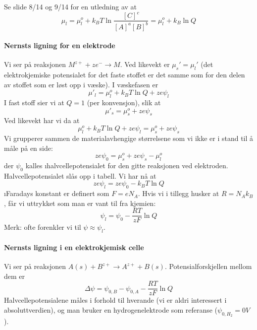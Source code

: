Se slide 8/14 og 9/14 for en utledning av at
\begin{equation}
	\mu_l=\mu_l^o+k_BT\ln\frac{[C]^c}{[A]^a[B]^b}=\mu_l^o+k_B\ln Q
\end{equation}

\paragraph{Nernsts ligning for en elektrode} Vi ser på reaksjonen $M^{z+}+ze^-\rightarrow M$. Ved likevekt er $\mu_{s}'=\mu_{l}'$ (det elektrokjemiske potensialet for det faste stoffet er det samme som for den delen av stoffet som er løst opp i væske).
I væskefasen er 
\begin{equation}
	\mu'_l=\mu_l^o+k_BT\ln Q+ze\psi_l
\end{equation}
I fast stoff sier vi at $Q=1$ (per konvensjon), slik at
\begin{equation}
	\mu'_s=\mu_s^o+ze\psi_s
\end{equation}
Ved likevekt har vi da at
\begin{equation}
	\mu_l^o+k_BT\ln Q+ze\psi_l=\mu_s^o+ze\psi_s
\end{equation}
Vi grupperer sammen de materialavhengige størrelsene som vi ikke er i stand til å måle på en side:
\begin{equation}
	ze\psi_0=\mu_s^o+ze\psi_s-\mu_l^o
\end{equation}
der $\psi_0$ kalles \i{halvcellepotensialet} for den gitte reaksjonen ved elektroden. Halvcellepotensialet slås opp i tabell. Vi har nå at
\begin{equation}
	ze\psi_l=ze\psi_0-k_BT\ln Q
\end{equation}
\i{Faradays konstant} er definert som $F=eN_A$. Hvis vi i tillegg husker at $R=N_Ak_B$, får vi uttrykket som man er vant til fra kjemien:
\begin{equation}
	\psi_l=\psi_0-\frac{RT}{zF}\ln Q
\end{equation}
Merk: ofte forenkler vi til $\psi\approx\psi_l$.

\paragraph{Nernsts ligning i en elektrokjemisk celle} Vi ser på reaksjonen $A(s)+B^{z+}\rightarrow A^{z+}+B(s)$. Potensialforskjellen mellom dem er
\begin{equation}
	\Delta \psi=\psi_{0,B}-\psi_{0,A}-\frac{RT}{zF}\ln Q
\end{equation}
Halvcellepotensialene måles i forhold til hverande (vi er aldri interessert i absoluttverdien), og man bruker en hydrogenelektrode som referanse ($\psi_{0,H_2}=0V$). 
